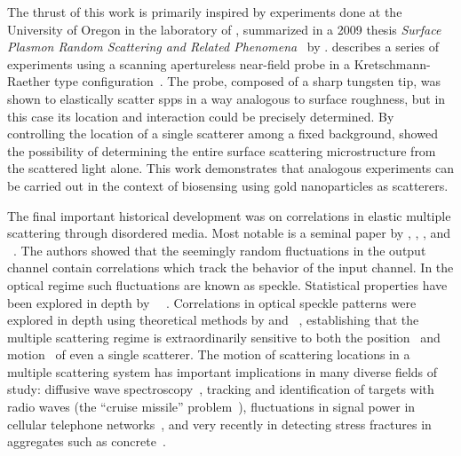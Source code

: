 The thrust of this work is primarily inspired by experiments done at the
University of Oregon in the laboratory of , summarized in a 2009
thesis \textit{Surface Plasmon Random Scattering and Related
  Phenomena}~\cite{schumann2009surface} by .  
describes a series of experiments using a scanning apertureless near-field
probe in a Kretschmann-Raether type configuration~\cite{kim1995scanning}.  The
probe, composed of a sharp tungsten tip, was shown to elastically scatter \glspl{spp}
in a way analogous to surface roughness, but in this case its location and
interaction could be precisely determined.  By controlling the location of
a single scatterer among a fixed background,  showed the
possibility of determining the entire surface scattering microstructure from
the scattered light alone.  This work demonstrates that analogous experiments
can be carried out in the context of biosensing using gold nanoparticles as
scatterers.

The final important historical development was on correlations in elastic
multiple scattering through disordered media.  Most notable is a seminal paper
by , , , and
~\cite{feng1988correlations}.  The authors showed that the
seemingly random fluctuations in the output channel contain correlations which
track the behavior of the input channel.  In the optical regime such
fluctuations are known as speckle.  Statistical properties have been explored
in depth by
~\cite{goodman2007speckle}~\cite{goodman1975statistical}.
Correlations in optical speckle patterns were explored in depth using
theoretical methods by  and
~\cite{berkovits1994correlations}, establishing that the multiple
scattering regime is extraordinarily sensitive to both the
position~\cite{berkovits1990theory} and motion~\cite{berkovits1991sensitivity}
of even a single scatterer.  The motion of scattering locations in a multiple
scattering system has important implications in many diverse fields of study:
diffusive wave spectroscopy~\cite{pine1988diffusing}, tracking and
identification of targets with radio waves (the ``cruise missile''
problem~\cite{atkins1991neural}), fluctuations in signal power in cellular
telephone networks~\cite{abdi2001estimation}, and very recently in detecting
stress fractures in aggregates such as concrete~\cite{larose2010locating}.
